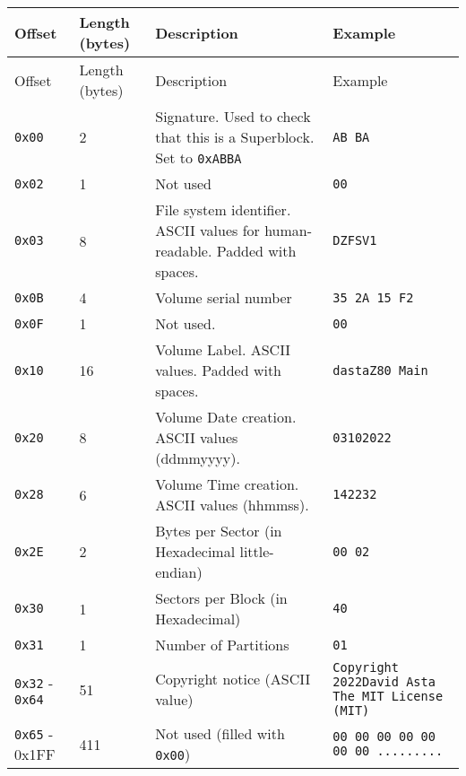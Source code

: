 \documentclass[a4paper,11pt]{article}
\begin{document}
        \begin{longtable}{ |m{2.2cm}|m{1.3cm}|m{6cm}|m{2.7cm}| }
            \hline
            \rowcolor{lightgray}
            Offset & Length (bytes) & Description & Example\\
            \hline
            \endfirsthead

            \hline
            \rowcolor{lightgray}
            Offset & Length (bytes) & Description & Example\\
            \hline
            \endhead

            \texttt{0x00} & 2 & Signature. Used to check that this is a
            Superblock. Set to \texttt{0xABBA} & \texttt{AB BA}\\
            \hline
            \texttt{0x02} & 1 & Not used & \texttt{00}\\
            \hline
            \texttt{0x03} & 8 & File system identifier. ASCII values for
            human-readable. Padded with spaces. & \texttt{DZFSV1}\\
            \hline
            \texttt{0x0B} & 4 & Volume serial number & \texttt{35 2A 15 F2}\\
            \hline
            \texttt{0x0F} & 1 & Not used. & \texttt{00}\\
            \hline
            \texttt{0x10} & 16 & Volume Label. ASCII values. Padded with spaces. 
            & \texttt{dastaZ80 Main}\\
            \hline
            \texttt{0x20} & 8 & Volume Date creation. ASCII values (ddmmyyyy).
            & \texttt{03102022}\\
            \hline
            \texttt{0x28} & 6 & Volume Time creation. ASCII values (hhmmss).
            & \texttt{142232}\\
            \hline
            \texttt{0x2E} & 2 & Bytes per Sector (in Hexadecimal little-endian)
            & \texttt{00 02}\\
            \hline
            \texttt{0x30} & 1 & Sectors per Block (in Hexadecimal) & \texttt{40}\\
            \hline
            \texttt{0x31} & 1 & Number of Partitions & \texttt{01}\\
            \hline
            \texttt{0x32} - \texttt{0x64} & 51 & Copyright notice (ASCII value)
            & \texttt{Copyright 2022David Asta The MIT License (MIT)}\\
            \hline
            \texttt{0x65} - 0x1FF & 411 & Not used (filled with \texttt{0x00})
            & \texttt{00 00 00 00 00 00 00 .........}\\
            \hline
        \end{longtable}
\end{document}
